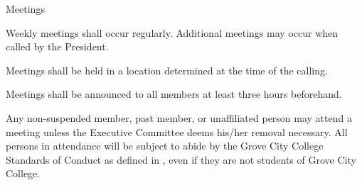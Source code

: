 {
\begin{article}{Meetings}
	\item Weekly meetings shall occur regularly. Additional meetings may occur when called by the President.
	\item Meetings shall be held in a location determined at the time of the calling.
	\item Meetings shall be announced to all members at least three hours beforehand.
	\item Any non-suspended member, past member, or unaffiliated person may attend a meeting unless the Executive Committee deems his/her removal necessary. All persons in attendance will be subject to abide by the Grove City College Standards of Conduct as defined in \crimson, even if they are not students of Grove City College.
\end{article}
}